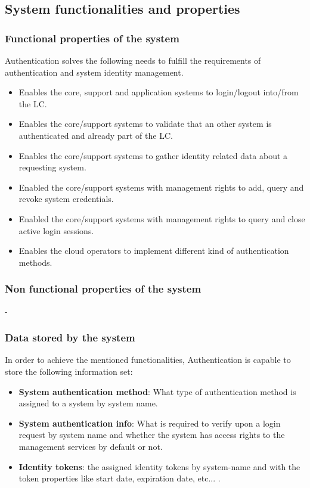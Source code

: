\documentclass[a4paper]{arrowhead}
\begin{document}
\newpage

\subsection{System functionalities and properties}
\label{sec:properties}

\subsubsection {Functional properties of the system}

Authentication solves the following needs to fulfill the requirements of authentication and system identity management.

\begin{itemize}
    \item Enables the core, support and application systems to login/logout into/from the LC.
    \item Enables the core/support systems to validate that an other system is authenticated and already part of the LC.
    \item Enables the core/support systems to gather identity related data about a requesting system.
    \item Enabled the core/support systems with management rights to add, query and revoke system credentials.
    \item Enabled the core/support systems with management rights to query and close active login sessions.
    \item Enables the cloud operators to implement different kind of authentication methods.
\end{itemize}

\subsubsection {Non functional properties of the system}
-

\subsubsection {Data stored by the system}
In order to achieve the mentioned functionalities, Authentication is capable to store the following information set:

\begin{itemize}
    \item \textbf{System authentication method}: What type of authentication method is assigned to a system by system name.
    \item \textbf{System authentication info}: What is required to verify upon a login request by system name and whether the system has access rights to the management services by default or not.
    \item \textbf{Identity tokens}: the assigned identity tokens by system-name and with the token properties like start date, expiration date, etc... .
\end{itemize}
\end{document}
